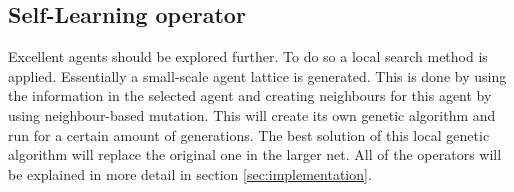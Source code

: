 \subsection*{Self-Learning operator}
Excellent agents should be explored further.
To do so a local search method is applied.
Essentially a small-scale agent lattice is generated.
This is done by using the information in the selected agent and creating neighbours for this agent by using neighbour-based mutation.
This will create its own genetic algorithm and run for a certain amount of generations.
The best solution of this local genetic algorithm will replace the original one in the larger net.
All of the operators will be explained in more detail in section \ref{sec:implementation}.


